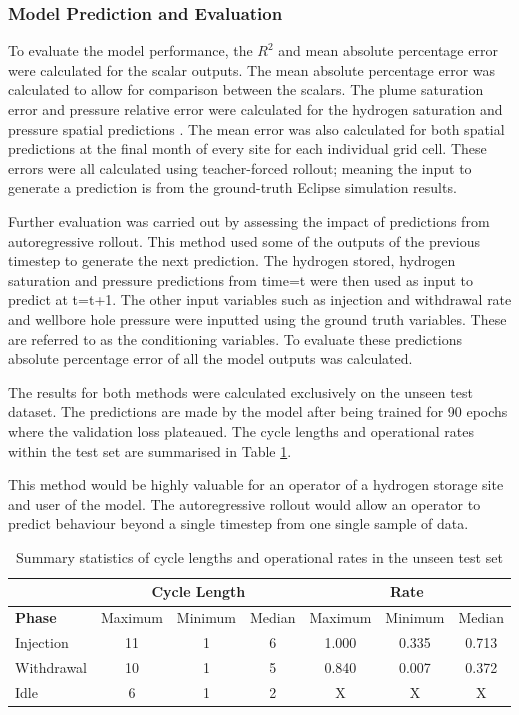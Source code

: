 \subsubsection{Model Prediction and Evaluation}
To evaluate the model performance, the $R^2$ and mean absolute percentage error were calculated for the scalar outputs. The mean absolute percentage error was calculated to allow for comparison between the scalars. The plume saturation error and pressure relative error were calculated for the hydrogen saturation and pressure spatial predictions \citep{gegewen_nested}. The mean error was also calculated for both spatial predictions at the final month of every site for each individual grid cell. These errors were all calculated using teacher-forced rollout; meaning the input to generate a prediction is from the ground-truth Eclipse simulation results. 

Further evaluation was carried out by assessing the impact of predictions from autoregressive rollout. This method used some of the outputs of the previous timestep to generate the next prediction. The hydrogen stored, hydrogen saturation and pressure predictions from time=t were then used as input to predict at t=t+1. The other input variables such as injection and withdrawal rate and wellbore hole pressure were inputted using the ground truth variables. These are referred to as the conditioning variables. To evaluate these predictions absolute percentage error of all the model outputs was calculated. 

The results for both methods were calculated exclusively on the unseen test dataset. The predictions are made by the model after being trained for 90 epochs where the validation loss plateaued. The cycle lengths and operational rates within the test set are summarised in Table \ref{tab:test_cycle_lengths}.

This method would be highly valuable for an operator of a hydrogen storage site and user of the model. The autoregressive rollout would allow an operator to predict behaviour beyond a single timestep from one single sample of data. 

\begin{table}[H]
    \centering
    \begin{tabular}{lcccccc}
         \toprule
         & \multicolumn{3}{c}{\textbf{Cycle Length}} & \multicolumn{3}{c}{\textbf{Rate}} \\
        \midrule
        \textbf{Phase} & Maximum & Minimum & Median & Maximum & Minimum & Median \\
        \midrule
        Injection & 11 & 1 & 6 & 1.000 & 0.335 & 0.713 \\
        Withdrawal & 10 & 1 & 5 & 0.840 & 0.007 & 0.372 \\
        Idle & 6 & 1 & 2 & X & X & X \\
        \bottomrule
    \end{tabular}
    \caption{Summary statistics of cycle lengths and operational rates in the unseen test set}
    \label{tab:test_cycle_lengths}
\end{table}

 



